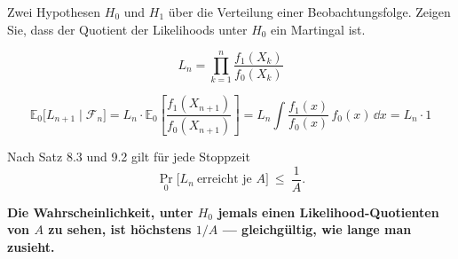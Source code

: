 \begin{aufgabe}
Zwei Hypothesen $H_0$ und $H_1$ über die Verteilung einer Beobachtungsfolge. Zeigen Sie, dass der Quotient der Likelihoods unter $H_0$ ein Martingal ist.

\loesung
{}
\[ L_n = \prod_{k=1}^{n} \frac{f_1(X_k)}{f_0(X_k)} \]

\[ \mathbb{E}_0\bigl[L_{n+1} \mid \mathcal F_n\bigr] = L_n\cdot\mathbb{E}_0\left[\frac{f_1(X_{n+1})}{f_0(X_{n+1})}\right] = L_n \int \frac{f_1(x)}{f_0(x)}\,f_0(x)\,\dd x = L_n\cdot 1 \]

Nach Satz 8.3 und 9.2 gilt für jede Stoppzeit
\[ \Pr_0\bigl[L_n \ \text{erreicht je } A\bigr] \ \le\ \frac{1}{A} . \]

\begin{center}
\begin{minipage}{0.9\textwidth}
\textbf{Die Wahrscheinlichkeit, unter $H_0$ jemals einen Likelihood-Quotienten von $A$ zu sehen, ist höchstens $1/A$ --- gleichgültig, wie lange man zusieht.}
\end{minipage}
\end{center}

\begin{center}
\begin{minipage}{0.88\textwidth}
\end{minipage}
\end{center}
\end{aufgabe}

